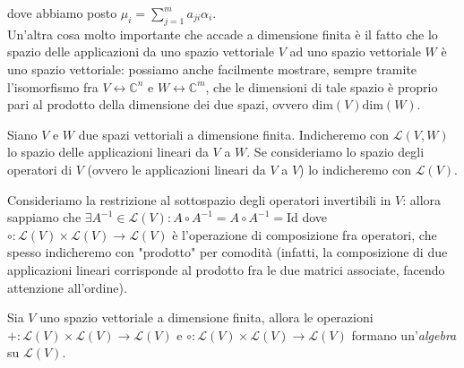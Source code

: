 \documentclass[12pt, twoside, italian, openany]{book}
\begin{document}
	dove abbiamo posto $\mu_i = \sum\limits_{j=1}^m a_{ji} \alpha_i$. \\
	Un'altra cosa molto importante che accade a dimensione finita è il fatto che lo spazio delle applicazioni da uno spazio vettoriale $V$ ad uno spazio vettoriale $W$ è uno spazio vettoriale: possiamo anche facilmente mostrare, sempre tramite l'isomorfismo fra $V \longleftrightarrow \mathbb{C}^n$ e $W \longleftrightarrow \mathbb{C}^m$, che
	le dimensioni di tale spazio è proprio pari al prodotto della dimensione dei due spazi, ovvero $\text{dim}(V)\text{dim}(W)$. \\
	\begin{definition}
		Siano $V$ e $W$ due spazi vettoriali a dimensione finita. Indicheremo con $\mathcal{L}(V, W)$ lo spazio delle applicazioni lineari da $V$ a $W$. Se consideriamo lo spazio degli operatori di $V$ (ovvero le applicazioni lineari da $V$ a $V$) lo indicheremo con $\mathcal{L}(V)$.
	\end{definition}
	Consideriamo la restrizione al sottospazio degli operatori invertibili in $V$: allora sappiamo che $\exists A^{-1} \in \mathcal{L}(V): A \circ A^{-1} = A \circ A^{-1} = \text{Id}$ dove $\circ: \mathcal{L}(V) \times \mathcal{L}(V) \to \mathcal{L}(V)$ è l'operazione di composizione fra operatori,
	che spesso indicheremo con "prodotto" per comodità (infatti, la composizione di due applicazioni lineari corrisponde al prodotto fra le due matrici associate, facendo attenzione all'ordine).
	\begin{definition}
		Sia $V$ uno spazio vettoriale a dimensione finita, allora le operazioni $+: \mathcal{L}(V) \times \mathcal{L}(V) \to \mathcal{L}(V)$ e $\circ: \mathcal{L}(V) \times \mathcal{L}(V) \to \mathcal{L}(V)$ formano un'\emph{algebra} su $\mathcal{L}(V)$.
	\end{definition}
\end{document}
